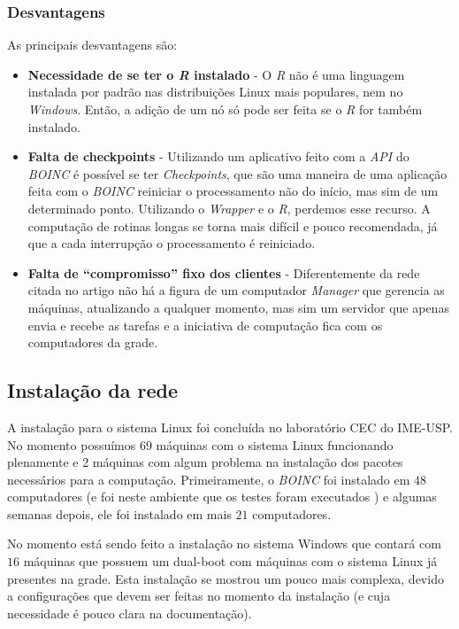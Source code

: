 \subsubsection{Desvantagens}

As principais desvantagens são:

\begin{itemize}
  \item \textbf{Necessidade de se ter o \emph{R} instalado} - O \emph{R} não é uma linguagem ins\-ta\-la\-da por padrão
nas distribuições Linux mais populares, nem no \emph{Windows}. Então, a adição de um nó só pode ser feita se o \emph{R}
for também instalado. 
  \item \textbf{Falta de checkpoints} - Utilizando um aplicativo feito com a \emph{API} do \emph{BOINC} é possível se ter
\emph{Checkpoints}, que são uma maneira de uma aplicação feita com o \emph{BOINC} reiniciar o processamento
não do início, mas sim de um determinado ponto. Utilizando o \emph{Wrapper} e o \emph{R}, perdemos esse recurso. A computação
de rotinas longas se torna mais difícil e pouco recomendada, já que a cada interrupção o processamento é reiniciado. 
  \item \textbf{Falta de ``compromisso'' fixo dos clientes} - Diferentemente da rede citada no artigo \cite{Dias}
não há a figura de um computador \emph{Manager} que gerencia as máquinas, atualizando a qualquer momento, mas sim um servidor 
que apenas envia e recebe as tarefas e a iniciativa de computação fica com os computadores da grade. 

\end{itemize}

\subsection{Instalação da rede}

A instalação para o sistema Linux foi concluída no laboratório CEC do IME-USP. No momento possuímos $69$ máquinas com o sistema 
Linux funcionando plenamente e 2 máquinas com algum problema na instalação dos pacotes 
necessários para a computação.  Primeiramente, o \textit{BOINC} foi instalado em $48$ computadores (e foi neste ambiente que os testes foram executados )
e algumas semanas depois, ele foi instalado em mais $21$ computadores. 

No momento está sendo feito a instalação no sistema Windows que contará com $16$ máquinas que possuem um dual-boot
com máquinas com o sistema Linux já presentes na grade. Esta instalação se mostrou um pouco mais complexa, de\-vi\-do a 
configurações que devem ser feitas no momento da instalação (e cuja necessidade é pouco clara na documentação).

